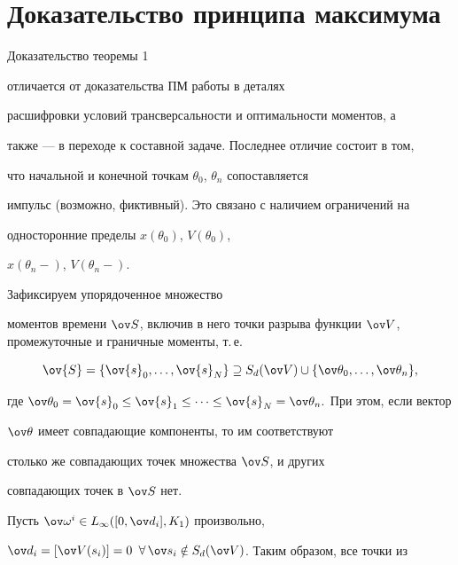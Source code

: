 \section{Доказательство принципа максимума}





Доказательство теоремы 1


отличается от доказательства ПМ работы \cite{DS99} в деталях


расшифровки условий трансверсальности и оптимальности моментов, а


также --- в переходе к составной задаче. Последнее отличие состоит в том,


что начальной и конечной точкам $\theta_0$, $\theta_n$ сопоставляется


импульс (возможно, фиктивный). Это связано с наличием ограничений на


односторонние пределы $x(\theta_0)$, $V(\theta_0)$,


$x(\theta_n-)$, $V(\theta_n-)$.





Зафиксируем упорядоченное множество


моментов времени $\ov S$, включив в него точки разрыва функции $\ov


V$, промежуточные и граничные моменты, т.\,е.


$$


\ov{S}=\{\ov{s}_0,\dotsc,\ov{s}_N\} \supseteq


S_d(\ov V)\cup \{\ov \theta_0,\dotsc,\ov\theta_n\},


$$


где $\ov\theta_0=\ov{s}_0 \leq \ov{s}_1\leq\dotsb \leq


\ov{s}_N= \ov\theta_n.$ При этом, если вектор


$\ov \theta$ имеет совпадающие компоненты, то им соответствуют


столько же совпадающих точек множества $\ov S$, и других


совпадающих точек в $\ov S$ нет.





Пусть $\ov\omega^i\in


L_\infty([0,\ov d_i],K_1)$ произвольно,


$\ov d_i=[\ov V(s_i)]=0$ $\forall\, \ov


s_i\notin S_d(\ov V)$. Таким образом, все точки из


